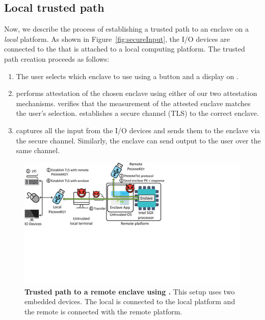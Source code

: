 


\subsection{Local trusted path} 

Now, we describe the process of establishing a trusted path to an enclave on a \emph{local} platform. As shown in Figure~\ref{fig:secureInput}, the I/O devices are connected to the \device that is attached to a local computing platform. The trusted path creation proceeds as follows:

\begin{enumerate}
    \item[\one] The user selects which enclave to use using a button and a display on \device.
    \item[\two] \device performs attestation of the chosen enclave using either of our two attestation mechanisms. \device verifies that the measurement of the attested enclave matches the user's selection. \device establishes a secure channel (TLS) to the correct enclave.
    \item[\three] \device captures all the input from the I/O devices and sends them to the enclave via the secure channel. Similarly, the enclave can send output to the user over the same channel.
\end{enumerate}
 

\begin{figure}[t]
 \centering
  \includegraphics[trim={0 8cm 14cm 0},clip,width=0.85\linewidth]{chapters/ProximiTEE/images_new/SystemDesignRemote.pdf}
 \caption[Trusted path to a remote enclave using \device]{\textbf{Trusted path to a remote enclave using \device.} This setup uses two embedded devices. The local \device is connected to the local platform and the remote \device is connected with the remote platform.}
 \label{fig:systemRemoteHost}
\end{figure}

